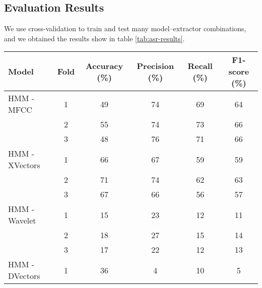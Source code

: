 \documentclass[conference]{IEEEtran}
\begin{document}
\subsection{Evaluation Results}
We use cross-validation to train and test many model–extractor combinations, and we obtained the results show in table \ref{tab:asr-results}.


\begin{table*}[htbp]
    \centering
    \caption{Evaluation Results of Different ASR Models Across Folds}
    \label{tab:asr-results}
    \begin{tabular}{|l|c|c|c|c|c|}
        \hline
        \textbf{Model}       & \textbf{Fold} & \textbf{Accuracy (\%)} & \textbf{Precision (\%)} & \textbf{Recall (\%)} & \textbf{F1-score (\%)} \\
        \hline
        HMM - MFCC           & 1             & 49                     & 74                      & 69                   & 64                     \\
                             & 2             & 55                     & 74                      & 73                   & 66                     \\
                             & 3             & 48                     & 76                      & 71                   & 66                     \\
        HMM - XVectors       & 1             & 66                     & 67                      & 59                   & 59                     \\
                             & 2             & 71                     & 74                      & 62                   & 63                     \\
                             & 3             & 67                     & 66                      & 56                   & 57                     \\
        HMM - Wavelet        & 1             & 15                     & 23                      & 12                   & 11                     \\
                             & 2             & 18                     & 27                      & 15                   & 14                     \\
                             & 3             & 17                     & 22                      & 12                   & 13                     \\
        HMM - DVectors       & 1             & 36                     & 4                       & 10                   & 5                      \\

\end{tabular}
\end{table*}
\end{document}
